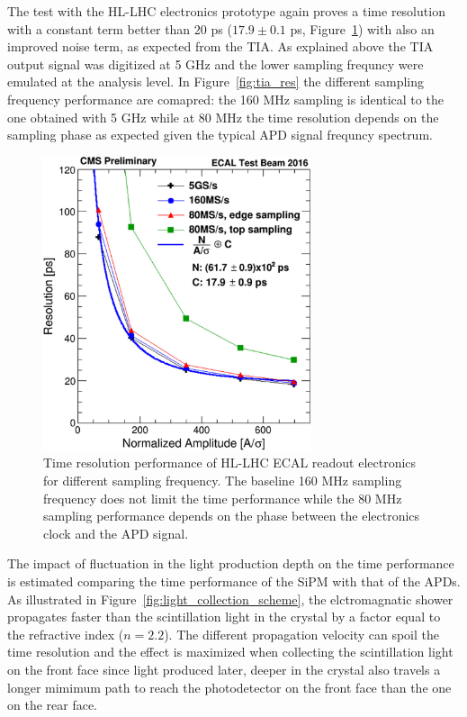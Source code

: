 The test with the HL-LHC electronics prototype again proves a time resolution with a constant term
better than $20$ ps ($17.9\pm 0.1$ ps, Figure~\ref{fig:tia_tres}) with also an improved noise term, as expected
from the TIA.
As explained above the TIA output signal was digitized at 5 GHz and the lower sampling frequncy were emulated at the
analysis level. In Figure~\ref{fig:tia_res} the different sampling frequency performance are comapred:
the 160 MHz sampling is identical to the one obtained with 5 GHz while at 80 MHz the time resolution
depends on the sampling phase as expected given the typical APD signal frequncy spectrum. 

\begin{figure}[h!]
  \centering
  \includegraphics[width = 0.7\textwidth]{figures/upgrade/sampling_freq_res_comp.png}
  \caption{Time resolution performance of HL-LHC ECAL readout electronics for different sampling frequency.
    The baseline 160 MHz sampling frequency does not limit the time performance while the 80 MHz sampling
    performance depends on the phase between the electronics clock and the APD signal.}
  \label{fig:tia_tres}
\end{figure}

The impact of fluctuation in the light production depth on the time performance is estimated comparing the
time performance of the SiPM with that of the APDs. As illustrated in Figure~\ref{fig:light_collection_scheme}, 
the elctromagnatic shower propagates faster than the scintillation light in the crystal by a factor equal
to the \PbWO refractive index ($n=2.2$). The different propagation velocity can spoil the time resolution and the
effect is maximized when collecting the scintillation light on the front face since light produced later, deeper in
the crystal also travels a longer mimimum path to reach the photodetector on the front face than the one on the rear face.

